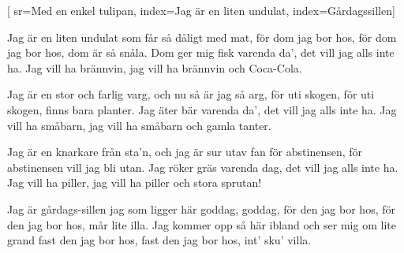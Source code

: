


[
	sr={Med en enkel tulipan},
	index={Jag är en liten undulat},
	index={Gårdagssillen}]		%
	
\beginverse*		%
Jag är en liten undulat
som får så dåligt med mat,
för dom jag bor hos,
för dom jag bor hos, dom är så snåla.
Dom ger mig fisk varenda da',
det vill jag alls inte ha.
Jag vill ha brännvin,
jag vill ha brännvin och Coca-Cola.
\endverse			%

\beginverse*		%
Jag är en stor och farlig varg,
och nu så är jag så arg,
för uti skogen,
för uti skogen, finns bara planter.
Jag äter bär varenda da',
det vill jag alls inte ha.
Jag vill ha småbarn,
jag vill ha småbarn och gamla tanter.
\endverse			%

\beginverse*		%
Jag är en knarkare från sta'n,
och jag är sur utav fan
för abstinensen, för abstinensen vill jag bli utan.
Jag röker gräs varenda dag,
det vill jag alls inte ha.
Jag vill ha piller, 
jag vill ha piller
och stora sprutan!
\endverse			%

\beginverse*		%
Jag är gårdags-sillen jag
som ligger här goddag, goddag,
för den jag bor hos,
för den jag bor hos, mår lite illa.
Jag kommer opp så här ibland
och ser mig om lite grand
fast den jag bor hos,
fast den jag bor hos, int' sku' villa.
\endverse			%
\endsong			%
